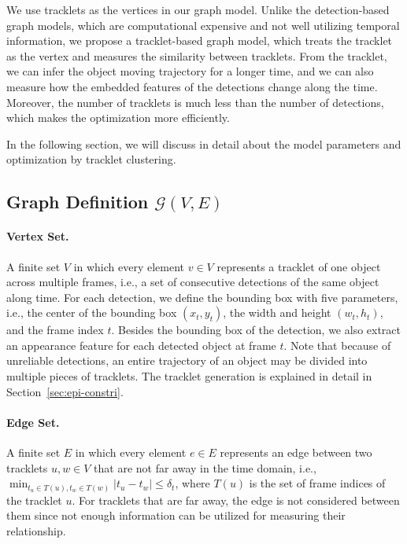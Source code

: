 \documentclass[10pt,twocolumn,letterpaper]{article}
\begin{document}
We use tracklets as the vertices in our graph model. Unlike the detection-based graph models, which are computational expensive and not well utilizing temporal information, we propose a tracklet-based graph model, which treats the tracklet as the vertex and measures the similarity between tracklets. From the tracklet, we can infer the object moving trajectory for a longer time, and we can also measure how the embedded features of the detections change along the time. Moreover, the number of tracklets is much less than the number of detections, which makes the optimization more efficiently.

In the following section, we will discuss in detail about the model parameters and optimization by tracklet clustering.

\subsection{Graph Definition $\mathbf{\mathcal{G}}(V,E)$}
\label{sec:graph-def}




\paragraph{Vertex Set.} 
A finite set $V$ in which every element $v \in V$ represents a tracklet of one object across multiple frames, i.e., a set of consecutive detections of the same object along time. For each detection, we define the bounding box with five parameters, i.e., the center 
of the bounding box $(x_t,y_t)$, the width and height $(w_t,h_t)$, and the frame index $t$. Besides the bounding box of the detection, we also extract an appearance feature \cite{schroff2015facenet} for each detected object at frame $t$. Note that because of unreliable detections, an entire trajectory of an object may be divided into multiple pieces of tracklets. The tracklet generation is explained in detail in Section~\ref{sec:epi-constri}.






\paragraph{Edge Set.} A finite set $E$ in which every element $e \in E$ represents an edge between two tracklets $u,w \in V$ that are not far away in the time domain, i.e., $\min_{t_u\in T(u), t_w \in T(w)} \lvert t_u - t_w \rvert \leq \delta_t$,
where $T(u)$ is the set of frame indices of the tracklet $u$. For tracklets that are far away, the edge is not considered between them since not enough information can be utilized for measuring their relationship. 
\end{document}
